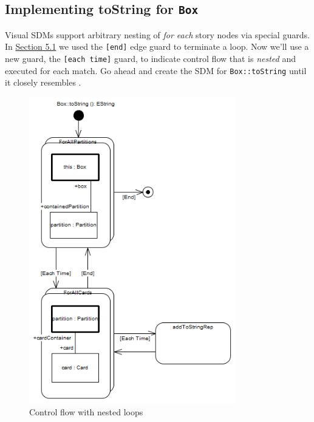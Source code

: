 \newpage
\hypertarget{stringRep vis}{}
\subsection{Implementing toString for \texttt{Box}}
\genHeader

\begin{stepbystep}

\item Visual SDMs support arbitrary nesting of \emph{for each} story nodes via special guards. In \hyperlink{emptyPartition vis}{Section
5.1} we used the \texttt{[end]} edge guard to terminate a loop. Now we'll use a new guard, the \texttt{[each time]} guard, to indicate
control flow that is \emph{nested} and executed for each match. Go ahead and create the SDM for \texttt{Box::toString} until it closely resembles
.

\begin{figure}[htbp]
\begin{center}
  \includegraphics[width=0.8\textwidth]{../../org.moflon.doc.handbook.03_storyDiagrams/10_stringRep/visSRImages/ea_toStringStart}
  \caption{Control flow with nested loops} 
  \label{ea:sdm_tostring_1}
\end{center}
\end{figure}


\end{stepbystep}
